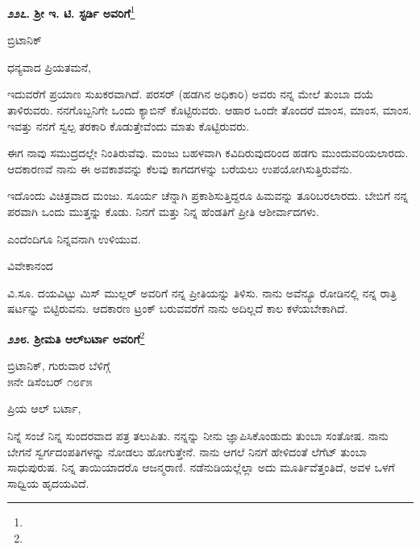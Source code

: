 \begin{center}
\textbf{೨೨೭. ಶ‍್ರೀ ಇ. ಟಿ. ಸ್ಟರ್ಡಿ ಅವರಿಗೆ}\footnote{}
\end{center}

\begin{flushright}
 ಬ್ರಿಟಾನಿಕ್
\end{flushright}

\noindent
ಧನ್ಯವಾದ ಪ್ರಿಯತಮನೆ,

ಇದುವರೆಗೆ ಪ್ರಯಾಣ ಸುಖಕರವಾಗಿದೆ. ಪರಸರ್ (ಹಡಗಿನ ಅಧಿಕಾರಿ) ಅವರು ನನ್ನ ಮೇಲೆ ತುಂಬಾ ದಯೆ ತಾಳಿರುವರು. ನನಗೊಬ್ಬನಿಗೇ ಒಂದು ಕ್ಯಾಬಿನ್ ಕೊಟ್ಟಿರುವರು. ಆಹಾರ ಒಂದೇ ತೊಂದರೆ\enginline{-} ಮಾಂಸ, ಮಾಂಸ, ಮಾಂಸ. ಇವತ್ತು ನನಗೆ ಸ್ವಲ್ಪ ತರಕಾರಿ ಕೊಡುತ್ತೇವೆಂದು ಮಾತು ಕೊಟ್ಟಿರುವರು.

ಈಗ ನಾವು ಸಮುದ್ರದಲ್ಲೇ ನಿಂತಿರುವೆವು. ಮಂಜು ಬಹಳವಾಗಿ ಕವಿದಿರುವುದರಿಂದ ಹಡಗು ಮುಂದುವರಿಯಲಾರದು. ಆದಕಾರಣವೆ ನಾನು ಈ ಅವಕಾಶವನ್ನು ಕೆಲವು ಕಾಗದಗಳನ್ನು ಬರೆಯಲು ಉಪಯೋಗಿಸುತ್ತಿರುವೆನು.

ಇದೊಂದು ವಿಚಿತ್ರವಾದ ಮಂಜು. ಸೂರ್ಯ ಚೆನ್ನಾಗಿ ಪ್ರಕಾಶಿಸುತ್ತಿದ್ದರೂ ಹಿಮವನ್ನು ತೂರಿಬರಲಾರದು. ಬೇಬಿಗೆ ನನ್ನ ಪರವಾಗಿ ಒಂದು ಮುತ್ತನ್ನು ಕೊಡು. ನಿನಗೆ ಮತ್ತು ನಿನ್ನ ಹೆಂಡತಿಗೆ ಪ್ರೀತಿ ಆಶೀರ್ವಾದಗಳು.

ಎಂದೆಂದಿಗೂ ನಿನ್ನವನಾಗಿ ಉಳಿಯುವ.

\begin{flushright}
ವಿವೇಕಾನಂದ
\end{flushright}

ವಿ.ಸೂ.\enginline{-} ದಯವಿಟ್ಟು ಮಿಸ್ ಮುಲ್ಲರ್ ಅವರಿಗೆ ನನ್ನ ಪ್ರೀತಿಯನ್ನು ತಿಳಿಸು. ನಾನು ಅವೆನ್ಯೂ ರೋಡಿನಲ್ಲಿ ನನ್ನ ರಾತ್ರಿ ಷರ್ಟನ್ನು ಬಿಟ್ಟಿರುವನು. ಆದಕಾರಣ ಟ್ರಂಕ್ ಬರುವವರೆಗೆ ನಾನು ಅದಿಲ್ಲದೆ ಕಾಲ ಕಳೆಯಬೇಕಾಗಿದೆ.

\eject

\begin{center}
\textbf{೨೨೮. ಶ‍್ರೀಮತಿ ಆಲ್‌ಬರ್ಟಾ ಅವರಿಗೆ}\footnote{}
\end{center}

\begin{flushright}
 ಬ್ರಿಟಾನಿಕ್, ಗುರುವಾರ ಬೆಳಿಗ್ಗೆ\\೫ನೇ ಡಿಸೆಂಬರ್ ೧೮೯೫
\end{flushright}

\noindent
ಪ್ರಿಯ ಆಲ್ ಬರ್ಟಾ,

ನಿನ್ನೆ ಸಂಜೆ ನಿನ್ನ ಸುಂದರವಾದ ಪತ್ರ ತಲುಪಿತು. ನನ್ನನ್ನು ನೀನು ಜ್ಞಾಪಿಸಿಕೊಂಡುದು ತುಂಬಾ ಸಂತೋಷ. ನಾನು ಬೇಗನೆ ಸ್ವರ್ಗದಂಪತಿಗಳನ್ನು ನೋಡಲು ಹೋಗುತ್ತೇನೆ. ನಾನು ಆಗಲೆ ನಿನಗೆ ಹೇಳಿದಂತೆ ಲೆಗೆಟ್ ತುಂಬಾ ಸಾಧುಪುರುಷ. ನಿನ್ನ ತಾಯಿಯಾದರೊ ಆಜನ್ಮರಾಣಿ. ನಡೆನುಡಿಯಲ್ಲೆಲ್ಲಾ ಅದು ಮೂರ್ತಿವೆತ್ತಂತಿದೆ, ಅವಳ ಒಳಗೆ ಸಾಧ್ವಿಯ ಹೃದಯವಿದೆ.

